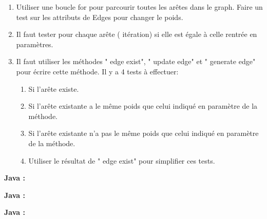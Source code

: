 \begin{Exercice}
    \begin{conseil}
    \begin{enumerate}
    \item Utiliser une boucle for pour parcourir toutes les arêtes dans le graph. Faire un test sur les attributs de Edges pour changer le poids.
    \item Il faut tester pour chaque arête ( itération) si elle  est égale à celle rentrée en paramètres.
    \item Il faut utiliser les méthodes " edge exist", " update edge" et " generate edge" pour écrire cette méthode. Il y a 4 tests à effectuer: 
        \begin{enumerate}
        \item Si l'arête existe.
        \item Si l'arête existante a le même poids que celui indiqué en paramètre de la méthode.
        \item Si l'arête existante n'a pas le même poids que celui indiqué en paramètre de la méthode.
        \item Utiliser le résultat de " edge exist" pour simplifier ces tests.
        \end{enumerate}
    \end{enumerate}
    \end{conseil}
    \begin{solution}
    \textbf{Java :}
         
    \end{solution}
    \begin{solution}
    \textbf{Java :}
         
    \end{solution}
    \begin{solution}
    \textbf{Java :}
         
    \end{solution}

\end{Exercice}



